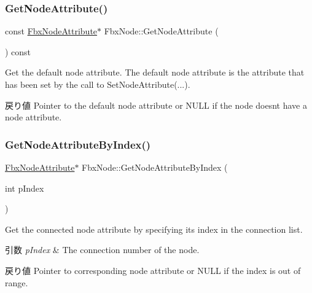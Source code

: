 \subsubsection{\texorpdfstring{Get\+Node\+Attribute()}{GetNodeAttribute()}\hspace{0.1cm}{\footnotesize\ttfamily [2/2]}}
{\footnotesize\ttfamily const \hyperlink{class_fbx_node_attribute}{Fbx\+Node\+Attribute}$\ast$ Fbx\+Node\+::\+Get\+Node\+Attribute (\begin{DoxyParamCaption}{ }\end{DoxyParamCaption}) const}

Get the default node attribute. The default node attribute is the attribute that has been set by the call to Set\+Node\+Attribute(...). \begin{DoxyReturn}{戻り値}
Pointer to the default node attribute or {\ttfamily N\+U\+LL} if the node doesn\textquotesingle{}t have a node attribute. 
\end{DoxyReturn}
\mbox{\label{class_fbx_node_a3948db592a4660170b284ac3aa203481}} 
\subsubsection{\texorpdfstring{Get\+Node\+Attribute\+By\+Index()}{GetNodeAttributeByIndex()}\hspace{0.1cm}{\footnotesize\ttfamily [1/2]}}
{\footnotesize\ttfamily \hyperlink{class_fbx_node_attribute}{Fbx\+Node\+Attribute}$\ast$ Fbx\+Node\+::\+Get\+Node\+Attribute\+By\+Index (\begin{DoxyParamCaption}\item[{int}]{p\+Index }\end{DoxyParamCaption})}

Get the connected node attribute by specifying its index in the connection list. 
\begin{DoxyParams}{引数}
{\em p\+Index} & The connection number of the node. \\
\hline
\end{DoxyParams}
\begin{DoxyReturn}{戻り値}
Pointer to corresponding node attribute or {\ttfamily N\+U\+LL} if the index is out of range. 
\end{DoxyReturn}
\mbox{\label{class_fbx_node_a7967e16e4540fe95e57f2ad7ad76578d}} 
